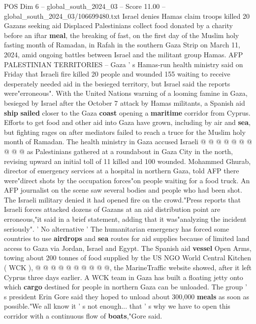\begin{textsample}{POS Dim 6 – global\_south\_2024\_03 – Score 11.00 – global\_south\_2024\_03/106699480.txt}  \label{ex:f6_pos_061}
Israel denies Hamas claim troops killed 20 Gazans seeking aid Displaced Palestinians collect food donated by a charity before an iftar \textbf{meal}, the breaking of fast, on the first day of the Muslim holy fasting month of Ramadan, in Rafah in the southern Gaza Strip on March 11, 2024, amid ongoing battles between Israel and the militant group Hamas.
AFP PALESTINIAN TERRITORIES -- Gaza ' s Hamas-run health ministry said on Friday that Israeli fire killed 20 people and wounded 155 waiting to receive desperately needed aid in the besieged territory, but Israel said the reports were"erroneous".
With the United Nations warning of a looming famine in Gaza, besieged by Israel after the October 7 attack by Hamas militants, a Spanish aid \textbf{ship} \textbf{sailed} closer to the Gaza \textbf{coast} opening a \textbf{maritime} corridor from Cyprus.
Efforts to get food and other aid into Gaza have grown, including by air and \textbf{sea}, but fighting rages on after mediators failed to reach a truce for the Muslim holy month of Ramadan.
The health ministry in Gaza accused Israeli @ @ @ @ @ @ @ @ @ @ as Palestinians gathered at a roundabout in Gaza City in the north, revising upward an initial toll of 11 killed and 100 wounded.
Mohammed Ghurab, director of emergency services at a hospital in northern Gaza, told AFP there were"direct shots by the occupation forces"on people waiting for a food truck.
An AFP journalist on the scene saw several bodies and people who had been shot.
The Israeli military denied it had opened fire on the crowd."Press reports that Israeli forces attacked dozens of Gazans at an aid distribution point are erroneous,"it said in a brief statement, adding that it was"analyzing the incident seriously". ' No alternative ' The humanitarian emergency has forced some countries to use \textbf{airdrops} and \textbf{sea} routes for aid supplies because of limited land access to Gaza via Jordan, Israel and Egypt.
The Spanish aid \textbf{vessel} Open Arms, towing about 200 tonnes of food supplied by the US NGO World Central Kitchen ( WCK ), @ @ @ @ @ @ @ @ @ @, the MarineTraffic website showed, after it left Cyprus three days earlier.
A WCK team in Gaza has built a floating jetty onto which \textbf{cargo} destined for people in northern Gaza can be unloaded.
The group ' s president Erin Gore said they hoped to unload about 300,000 \textbf{meals} as soon as possible."We all know it ' s not enough... that ' s why we have to open this corridor with a continuous flow of \textbf{boats},"Gore said.

\end{textsample}
